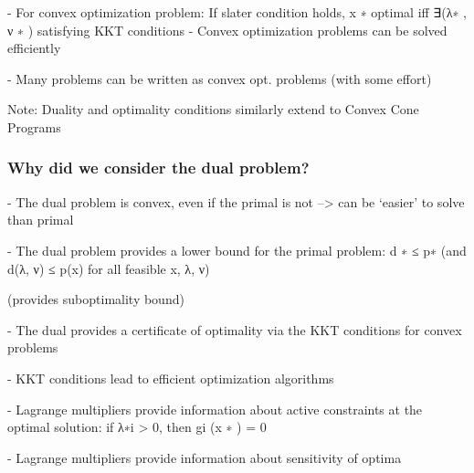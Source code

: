 - For convex optimization problem: If slater condition holds,
x ∗ optimal iff ∃(λ∗ , ν ∗ ) satisfying KKT conditions
- Convex optimization problems can be solved efficiently

- Many problems can be written as convex opt. problems (with some effort)

Note: Duality and optimality conditions similarly
extend to Convex Cone Programs

\subsubsection{Why did we consider the dual problem?}

- The dual problem is convex, even if the primal is not
–> can be ‘easier’ to solve than primal

- The dual problem provides a
lower bound for the primal problem: d ∗ ≤ p∗
(and d(λ, ν) ≤ p(x) for all feasible x, λ, ν)

(provides suboptimality bound)

- The dual provides a certificate of optimality
via the KKT conditions for convex problems

- KKT conditions lead to efficient optimization algorithms

- Lagrange multipliers provide information about active constraints
at the optimal solution: if λ∗i > 0, then gi (x ∗ ) = 0

- Lagrange multipliers provide information about sensitivity of optima

